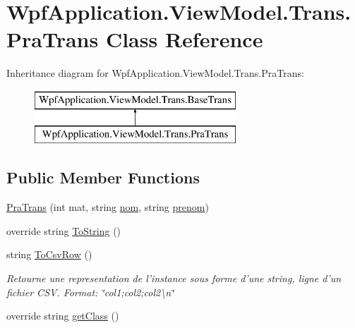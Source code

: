 \hypertarget{class_wpf_application_1_1_view_model_1_1_trans_1_1_pra_trans}{\section{Wpf\-Application.\-View\-Model.\-Trans.\-Pra\-Trans Class Reference}
\label{class_wpf_application_1_1_view_model_1_1_trans_1_1_pra_trans}
}
Inheritance diagram for Wpf\-Application.\-View\-Model.\-Trans.\-Pra\-Trans\-:\begin{figure}[H]
\begin{center}
\leavevmode
\includegraphics[height=2.000000cm]{class_wpf_application_1_1_view_model_1_1_trans_1_1_pra_trans}
\end{center}
\end{figure}
\subsection*{Public Member Functions}
\begin{DoxyCompactItemize}
\item 
\hyperlink{class_wpf_application_1_1_view_model_1_1_trans_1_1_pra_trans_aa5adc5e03191e8ba499f2aac5c9d6d09}{Pra\-Trans} (int mat, string \hyperlink{class_wpf_application_1_1_view_model_1_1_trans_1_1_pra_trans_a7440714237eda3b50d17c0c86f110527}{nom}, string \hyperlink{class_wpf_application_1_1_view_model_1_1_trans_1_1_pra_trans_aa0a1dc27ff028a606acbeaf3c00967e8}{prenom})
\item 
override string \hyperlink{class_wpf_application_1_1_view_model_1_1_trans_1_1_pra_trans_ad6aaa4787b9c62f1e8f4747269a4b9d7}{To\-String} ()
\item 
string \hyperlink{class_wpf_application_1_1_view_model_1_1_trans_1_1_pra_trans_ace508384ee863176bdfe40c1446dda47}{To\-Csv\-Row} ()
\begin{DoxyCompactList}\small\item\em Retourne une representation de l'instance sous forme d'une string, ligne d'un fichier C\-S\-V. Format\-: \char`\"{}col1;col2;col2\textbackslash{}n\char`\"{} \end{DoxyCompactList}\item 
override string \hyperlink{class_wpf_application_1_1_view_model_1_1_trans_1_1_pra_trans_a69e0d0034568e424fc88995a8bbfc06c}{get\-Class} ()
\end{DoxyCompactItemize}
